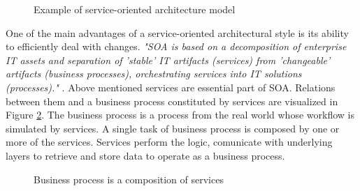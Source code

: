 \begin{figure}[htp] 
\caption{Example of service-oriented architecture model}
\label{fig:soa-architecture}
\end{figure}  

One of the main advantages of a service-oriented architectural style is its ability to efficiently deal with changes. \textit{"SOA is based on a decomposition of enterprise IT assets and separation of 'stable' IT artifacts (services) from 'changeable' artifacts (business processes), orchestrating services into IT solutions (processes)."} \cite{website:versioning-in-soa}.
Above mentioned services are essential part of SOA. Relations between them and a business process constituted by services are visualized in Figure \ref{fig:business-process-services}. The business process is a process from the real world whose workflow is simulated by services. A single task of business process is composed by one or more of the services. Services perform the logic, comunicate with underlying layers to retrieve and store data to operate as a business process.

\begin{figure}[htp] 
\caption{Business process is a composition of services}
\label{fig:business-process-services}
\end{figure} 

